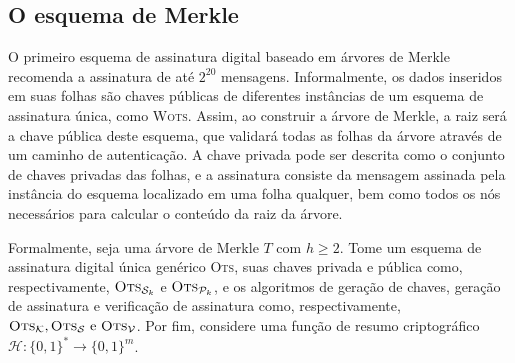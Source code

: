 \documentclass[12pt]{report}
\newcommand{\pk}{$\mathcal{P}_k$}
\newcommand{\sk}{$\mathcal{S}_k$}
\newcommand{\binwds}[1]{\{0, 1\}^{#1}}
\begin{document}
\subsection{O esquema de Merkle}

O primeiro esquema de assinatura digital baseado em árvores de Merkle \cite{Merkle:1989:CDS:118209.118230} recomenda a assinatura de até $2^{20}$ mensagens. Informalmente, os dados inseridos em suas folhas são chaves públicas de diferentes instâncias de um esquema de assinatura única, como \textsc{Wots}. Assim, ao construir a árvore de Merkle, a raiz será a chave pública deste esquema, que validará todas as folhas da árvore através de um caminho de autenticação. A chave privada pode ser descrita como o conjunto de chaves privadas das folhas, e a assinatura consiste da mensagem assinada pela instância do esquema localizado em uma folha qualquer, bem como todos os nós necessários para calcular o conteúdo da raiz da árvore.

Formalmente, seja uma árvore de Merkle $T$ com $h \geq 2$. Tome um esquema de assinatura digital única genérico \textsc{Ots}, suas chaves privada e pública como, respectivamente, $\textsc{Ots}_\text{\sk{}}$ e $\textsc{Ots}_\text{\pk{}}$, e os algoritmos de geração de chaves, geração de assinatura e verificação de assinatura como, respectivamente, $\textsc{Ots}_\mathcal{K}, \textsc{Ots}_\mathcal{S} \text{ e } \textsc{Ots}_\mathcal{V}$. Por fim, considere uma função de resumo criptográfico $\mathcal{H} : \binwds{*} \longrightarrow \binwds{m}$.
\end{document}
